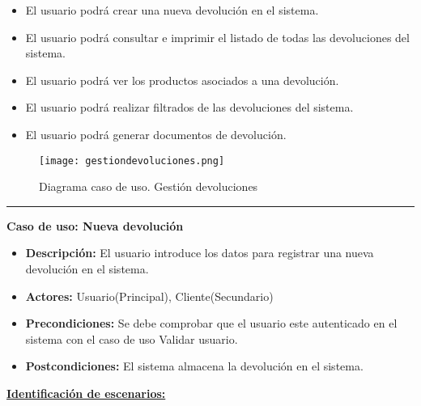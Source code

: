 \begin{itemize}
 \item El usuario podrá crear una nueva devolución en el sistema.
 \item El usuario podrá consultar e imprimir el listado de todas las devoluciones del sistema.
 \item El usuario podrá ver los productos asociados a una devolución.
 \item El usuario podrá realizar filtrados de las devoluciones del sistema.
 \item El usuario podrá generar documentos de devolución.

\end{itemize}
\begin{figure}[H]
  \centering
    \texttt{[image: gestiondevoluciones.png]}
  \caption{Diagrama caso de uso. Gestión devoluciones}
  \label{cu7}
\end{figure}
\smallskip
\hrule height 1pt
\smallskip
\textbf{Caso de uso: Nueva devolución}
\begin{itemize}\renewcommand{\labelitemi}{$\cdot$}
  \item \textbf{Descripción:} El usuario introduce los datos para registrar una nueva devolución en el sistema.
  \item \textbf{Actores:} Usuario(Principal), Cliente(Secundario)
  \item \textbf{Precondiciones:} Se debe comprobar que el usuario este autenticado en el sistema con el caso de uso Validar usuario.
  \item \textbf{Postcondiciones:} El sistema almacena la devolución en el sistema.
\end{itemize}
\underline{\textbf{Identificación de escenarios:}}
